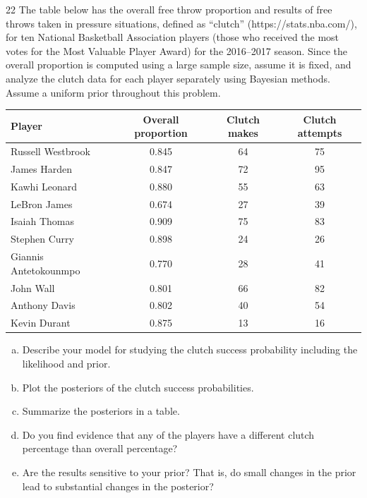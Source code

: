 \documentclass[11pt]{article}
\begin{document}

\begin{problem}{22}
The table below has the overall free throw proportion and results of free throws taken in pressure situations, defined as ``clutch'' (https://stats.nba.com/), for ten National Basketball Association players (those who received the most votes for the Most Valuable Player Award) for the 2016--2017 season. Since the overall proportion is computed using a large sample size, assume it is fixed, and analyze the clutch data for each player separately using Bayesian methods. Assume a uniform prior throughout this problem.
\begin{center}
\small
\begin{tabular}{lccc}\toprule
Player & Overall proportion & Clutch makes & Clutch attempts\\\midrule
Russell Westbrook & 0.845 & 64 & 75\\
James Harden & 0.847 & 72 & 95\\
Kawhi Leonard & 0.880 & 55 & 63\\
LeBron James & 0.674 & 27 & 39\\
Isaiah Thomas & 0.909 & 75 & 83\\
Stephen Curry & 0.898 & 24 & 26\\
Giannis Antetokounmpo & 0.770 & 28 & 41\\
John Wall & 0.801 & 66 & 82\\
Anthony Davis & 0.802 & 40 & 54\\
Kevin Durant & 0.875 & 13 & 16\\\bottomrule
\end{tabular}
\end{center}
\begin{enumerate}[(a)]
\item Describe your model for studying the clutch success probability including the likelihood and prior.
\item Plot the posteriors of the clutch success probabilities.
\item Summarize the posteriors in a table.
\item Do you find evidence that any of the players have a different clutch percentage than overall percentage?
\item Are the results sensitive to your prior? That is, do small changes in the prior lead to substantial changes in the posterior?
\end{enumerate}
\end{problem}
\end{document}
